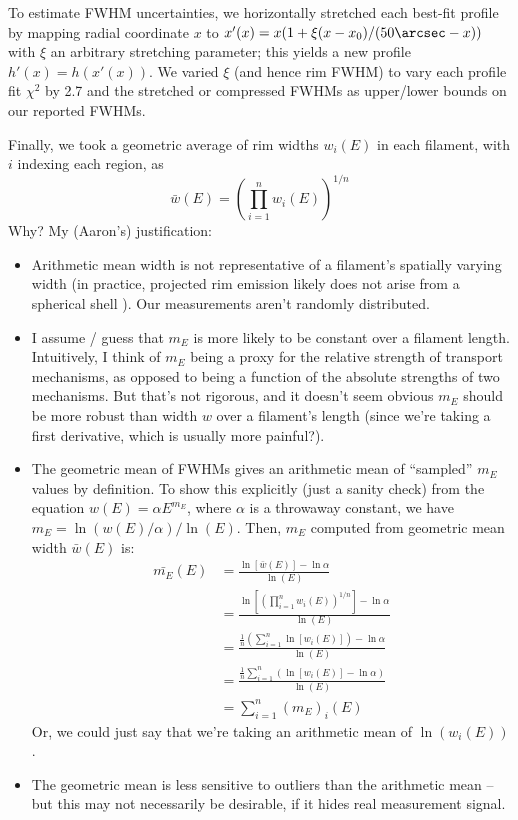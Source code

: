 \documentclass[12pt,preprint]{aastex}  %
\newcommand*\mean[1]{\bar{#1}}
\begin{document}
To estimate FWHM uncertainties, we horizontally stretched each best-fit
profile by mapping radial coordinate $x$ to
$x'(x) = x (1 + \xi (x-x_0)/(50\arcsec-x))$ with $\xi$ an arbitrary stretching
parameter; this yields a new profile $h'(x) = h(x'(x))$.
We varied $\xi$ (and hence rim FWHM) to vary each profile fit $\chi^2$ by 2.7
and the stretched or compressed FWHMs as upper/lower bounds on our reported
FWHMs.

Finally, we took a geometric average of rim widths $w_i(E)$ in each filament,
with $i$ indexing each region, as
\[
    \mean{w}(E) = \left( \prod_{i=1}^{n} w_i(E) \right)^{1/n}
\]
Why?  My (Aaron's) justification:
\begin{itemize}
\item Arithmetic mean width is not representative of a filament's
    spatially varying width (in practice, projected rim emission likely
    does not arise from a spherical shell \citep[c.f.][]{hester1987}).
    Our measurements aren't randomly distributed.
\item I assume / guess that $m_E$ is more likely to be constant over a
    filament length.  Intuitively, I think of $m_E$ being a proxy for the
    relative strength of transport mechanisms, as opposed to being a function
    of the absolute strengths of two mechanisms.  But that's not rigorous,
    and it doesn't seem obvious $m_E$ should be more robust than width $w$
    over a filament's length (since we're taking a first derivative, which
    is usually more painful?).
\item The geometric mean of FWHMs gives an arithmetic mean of ``sampled''
    $m_E$ values by definition.  To show this explicitly (just a sanity check)
    from the equation $w(E) = \alpha E^{m_E}$, where $\alpha$ is a throwaway
    constant, we have $m_E = \ln(w(E)/\alpha) / \ln(E)$.  Then, $m_E$ computed
    from geometric mean width $\mean{w}(E)$ is:
    \begin{align*}
        \mean{m_E}(E)
            &= \frac{\ln\left[ \mean{w}(E) \right] - \ln\alpha}{\ln(E)} \\
            &= \frac{\ln\left[ \left( \prod_{i=1}^{n} w_i(E) \right)^{1/n}
                        \right] - \ln\alpha}{\ln(E)} \\
            &= \frac{\frac{1}{n}\left(
                         \sum_{i=1}^{n} \ln\left[w_i(E)\right]
                     \right) - \ln\alpha}{\ln(E)} \\
            &= \frac{\frac{1}{n} \sum_{i=1}^{n}
                     \left( \ln\left[w_i(E)\right] - \ln\alpha \right)}
                    {\ln(E)} \\
            &= \sum_{i=1}^{n} (m_E)_i (E)
    \end{align*}
    Or, we could just say that we're taking an arithmetic mean of
    $\ln(w_i(E))$.
\item The geometric mean is less sensitive to outliers than the arithmetic
    mean -- but this may not necessarily be desirable, if it hides
    real measurement signal.
\end{itemize}
\end{document}
